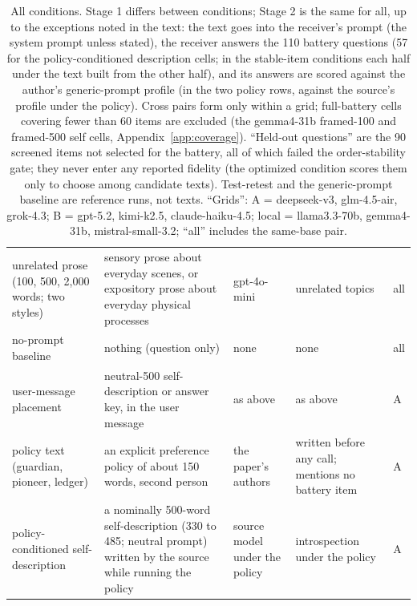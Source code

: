 \documentclass[11pt]{article}
\begin{document}
\begin{table}[p]
\begin{tabular}{>{\raggedright\arraybackslash}p{3.0cm}>{\raggedright\arraybackslash}p{4.2cm}>{\raggedright\arraybackslash}p{2.0cm}>{\raggedright\arraybackslash}p{3.6cm}>{\raggedright\arraybackslash}p{1.8cm}}
unrelated prose (100, 500, 2{,}000 words; two styles) & sensory prose about everyday scenes, or expository prose about everyday physical processes & gpt-4o-mini & unrelated topics & all \\
no-prompt baseline & nothing (question only) & none & none & all \\
user-message placement & neutral-500 self-description or answer key, in the user message & as above & as above & A \\
policy text (guardian, pioneer, ledger) & an explicit preference policy of about 150 words, second person & the paper's authors & written before any call; mentions no battery item & A \\
policy-conditioned self-description & a nominally 500-word self-description (330 to 485; neutral prompt) written by the source while running the policy & source model under the policy & introspection under the policy & A \\
\bottomrule
\end{tabular}
\caption{All conditions. Stage 1 differs between conditions;
Stage 2 is the same for all, up to the exceptions noted in the text: the text
goes into the receiver's prompt (the system prompt unless stated), the
receiver answers the 110 battery questions (57 for the policy-conditioned
description cells; in the stable-item conditions each half under the text
built from the other half), and its answers are scored against the
author's generic-prompt profile (in the two policy rows, against the
source's profile under the policy). Cross pairs form only within a grid;
full-battery cells covering fewer than 60 items are excluded (the gemma4-31b
framed-100 and framed-500 self cells,
Appendix~\ref{app:coverage}). ``Held-out questions'' are the 90 screened items not
selected for the battery, all of which failed the order-stability gate; they
never enter any reported fidelity (the
optimized condition scores them only to choose among candidate texts).
Test-retest and the generic-prompt baseline are reference runs, not texts.
``Grids'': A =
deepseek-v3, glm-4.5-air, grok-4.3; B = gpt-5.2, kimi-k2.5, claude-haiku-4.5;
local = llama3.3-70b, gemma4-31b, mistral-small-3.2; ``all'' includes the
same-base pair.}
\label{tab:conditions}
\end{table}
\end{document}
